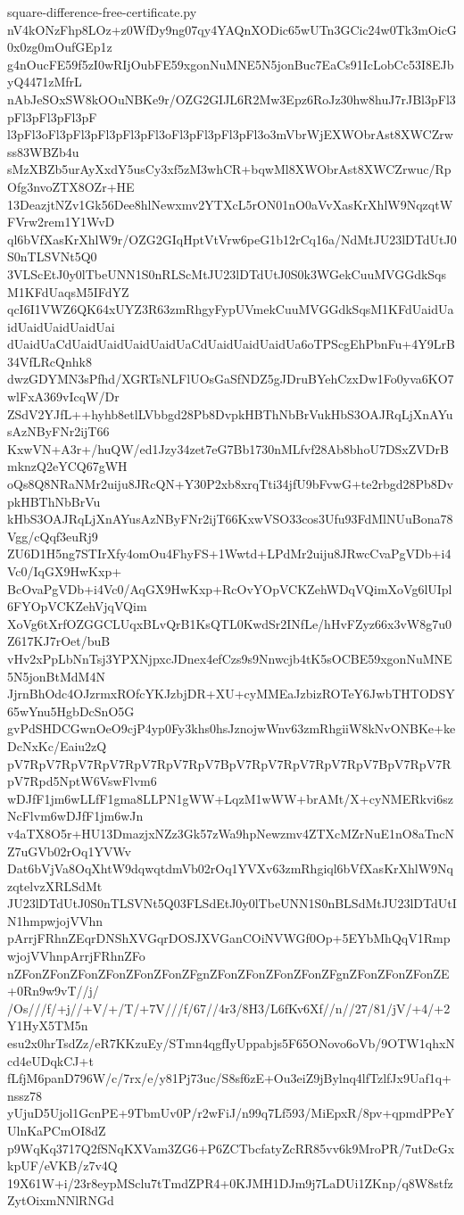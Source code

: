 \documentclass[11pt]{article}
\theoremstyle{definition}
\theoremstyle{remark}
\begin{document}
\begin{filecontents*}[overwrite]{square-difference-free-certificate.py}
nV4kONzFhp8LOz+z0WfDy9ng07qy4YAQnXODic65wUTn3GCic24w0Tk3mOicG0x0zg0mOufGEp1z
g4nOucFE59f5zI0wRIjOubFE59xgonNuMNE5N5jonBuc7EaCs91IcLobCc53I8EJbyQ4471zMfrL
nAbJeSOxSW8kOOuNBKe9r/OZG2GIJL6R2Mw3Epz6RoJz30hw8huJ7rJBl3pFl3pFl3pFl3pFl3pF
l3pFl3oFl3pFl3pFl3pFl3pFl3oFl3pFl3pFl3pFl3o3mVbrWjEXWObrAst8XWCZrwss83WBZb4u
sMzXBZb5urAyXxdY5usCy3xf5zM3whCR+bqwMl8XWObrAst8XWCZrwuc/RpOfg3nvoZTX8OZr+HE
13DeazjtNZv1Gk56Dee8hlNewxmv2YTXcL5rON01nO0aVvXasKrXhlW9NqzqtWFVrw2rem1Y1WvD
ql6bVfXasKrXhlW9r/OZG2GIqHptVtVrw6peG1b12rCq16a/NdMtJU23lDTdUtJ0S0nTLSVNt5Q0
3VLScEtJ0y0lTbeUNN1S0nRLScMtJU23lDTdUtJ0S0k3WGekCuuMVGGdkSqsM1KFdUaqsM5IFdYZ
qcI6I1VWZ6QK64xUYZ3R63zmRhgyFypUVmekCuuMVGGdkSqsM1KFdUaidUaidUaidUaidUaidUai
dUaidUaCdUaidUaidUaidUaidUaCdUaidUaidUaidUa6oTPScgEhPbnFu+4Y9LrB34VfLRcQnhk8
dwzGDYMN3sPfhd/XGRTsNLFlUOsGaSfNDZ5gJDruBYehCzxDw1Fo0yva6KO7wlFxA369vIcqW/Dr
ZSdV2YJfL++hyhb8etlLVbbgd28Pb8DvpkHBThNbBrVukHbS3OAJRqLjXnAYusAzNByFNr2ijT66
KxwVN+A3r+/huQW/ed1Jzy34zet7eG7Bb1730nMLfvf28Ab8bhoU7DSxZVDrBmknzQ2eYCQ67gWH
oQs8Q8NRaNMr2uiju8JRcQN+Y30P2xb8xrqTti34jfU9bFvwG+te2rbgd28Pb8DvpkHBThNbBrVu
kHbS3OAJRqLjXnAYusAzNByFNr2ijT66KxwVSO33cos3Ufu93FdMlNUuBona78Vgg/cQqf3euRj9
ZU6D1H5ng7STIrXfy4omOu4FhyFS+1Wwtd+LPdMr2uiju8JRwcCvaPgVDb+i4Vc0/IqGX9HwKxp+
BcOvaPgVDb+i4Vc0/AqGX9HwKxp+RcOvYOpVCKZehWDqVQimXoVg6lUIpl6FYOpVCKZehVjqVQim
XoVg6tXrfOZGGCLUqxBLvQrB1KsQTL0KwdSr2INfLe/hHvFZyz66x3vW8g7u0Z617KJ7rOet/buB
vHv2xPpLbNnTsj3YPXNjpxcJDnex4efCzs9s9Nnwcjb4tK5sOCBE59xgonNuMNE5N5jonBtMdM4N
JjrnBhOdc4OJzrmxROfcYKJzbjDR+XU+cyMMEaJzbizROTeY6JwbTHTODSY65wYnu5HgbDcSnO5G
gvPdSHDCGwnOeO9cjP4yp0Fy3khs0hsJznojwWnv63zmRhgiiW8kNvONBKe+keDcNxKc/Eaiu2zQ
pV7RpV7RpV7RpV7RpV7RpV7RpV7BpV7RpV7RpV7RpV7RpV7BpV7RpV7RpV7Rpd5NptW6VswFlvm6
wDJfF1jm6wLLfF1gma8LLPN1gWW+LqzM1wWW+brAMt/X+cyNMERkvi6szNcFlvm6wDJfF1jm6wJn
v4aTX8O5r+HU13DmazjxNZz3Gk57zWa9hpNewzmv4ZTXcMZrNuE1nO8aTncNZ7uGVb02rOq1YVWv
Dat6bVjVa8OqXhtW9dqwqtdmVb02rOq1YVXv63zmRhgiql6bVfXasKrXhlW9NqzqtelvzXRLSdMt
JU23lDTdUtJ0S0nTLSVNt5Q03FLSdEtJ0y0lTbeUNN1S0nBLSdMtJU23lDTdUtIN1hmpwjojVVhn
pArrjFRhnZEqrDNShXVGqrDOSJXVGanCOiNVWGf0Op+5EYbMhQqV1RmpwjojVVhnpArrjFRhnZFo
nZFonZFonZFonZFonZFonZFonZFgnZFonZFonZFonZFonZFgnZFonZFonZFonZE+0Rn9w9vT//j/
/Os///f/+j//+V/+/T/+7V///f/67//4r3/8H3/L6fKv6Xf//n//27/81/jV/+4/+2Y1HyX5TM5n
esu2x0hrTsdZz/eR7KKzuEy/STmn4qgfIyUppabjs5F65ONovo6oVb/9OTW1qhxNcd4eUDqkCJ+t
fLfjM6panD796W/c/7rx/e/y81Pj73uc/S8sf6zE+Ou3eiZ9jBylnq4lfTzlfJx9Uaf1q+nssz78
yUjuD5Ujol1GcnPE+9TbmUv0P/r2wFiJ/n99q7Lf593/MiEpxR/8pv+qpmdPPeYUlnKaPCmOI8dZ
p9WqKq3717Q2fSNqKXVam3ZG6+P6ZCTbcfatyZcRR85vv6k9MroPR/7utDcGxkpUF/eVKB/z7v4Q
19X61W+i/23r8eypMSclu7tTmdZPR4+0KJMH1DJm9j7LaDUi1ZKnp/q8W8stfzZytOixmNNlRNGd

\end{filecontents*}
\end{document}
